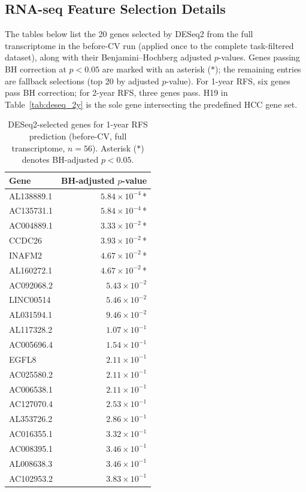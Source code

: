 \documentclass[12pt,twoside]{report}
\begin{document}
\begin{appendices}

\chapter{RNA-seq Feature Selection Details}
\label{app:rna_fs}

The tables below list the 20 genes selected by DESeq2 from the full transcriptome
in the before-CV run (applied once to the complete task-filtered dataset),
along with their Benjamini--Hochberg adjusted $p$-values.
Genes passing BH correction at $p < 0.05$ are marked with an asterisk ($*$);
the remaining entries are fallback selections (top 20 by adjusted $p$-value).
For 1-year RFS, six genes pass BH correction; for 2-year RFS, three genes pass.
H19 in Table~\ref{tab:deseq_2y} is the sole gene intersecting the predefined HCC gene set.

\begin{table}[h]
\centering
\caption{DESeq2-selected genes for 1-year RFS prediction
(before-CV, full transcriptome, $n=56$).
Asterisk ($*$) denotes BH-adjusted $p < 0.05$.}
\label{tab:deseq_1y}
\begin{tabular}{lr}
\hline
Gene & BH-adjusted $p$-value \\
\hline
AL138889.1 & $5.84 \times 10^{-4}$\,* \\
AC135731.1 & $5.84 \times 10^{-4}$\,* \\
AC004889.1 & $3.33 \times 10^{-2}$\,* \\
CCDC26     & $3.93 \times 10^{-2}$\,* \\
INAFM2     & $4.67 \times 10^{-2}$\,* \\
AL160272.1 & $4.67 \times 10^{-2}$\,* \\
AC092068.2 & $5.43 \times 10^{-2}$ \\
LINC00514  & $5.46 \times 10^{-2}$ \\
AL031594.1 & $9.46 \times 10^{-2}$ \\
AL117328.2 & $1.07 \times 10^{-1}$ \\
AC005696.4 & $1.54 \times 10^{-1}$ \\
EGFL8      & $2.11 \times 10^{-1}$ \\
AC025580.2 & $2.11 \times 10^{-1}$ \\
AC006538.1 & $2.11 \times 10^{-1}$ \\
AC127070.4 & $2.53 \times 10^{-1}$ \\
AL353726.2 & $2.86 \times 10^{-1}$ \\
AC016355.1 & $3.32 \times 10^{-1}$ \\
AC008395.1 & $3.46 \times 10^{-1}$ \\
AL008638.3 & $3.46 \times 10^{-1}$ \\
AC102953.2 & $3.83 \times 10^{-1}$ \\
\hline
\end{tabular}
\end{table}


\end{appendices}
\end{document}
